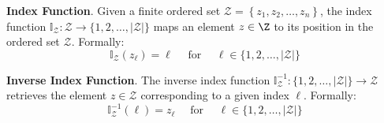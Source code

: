 
\textbf{Index Function}. 
Given a finite ordered set $\mathcal{Z}=\left\{z_1, z_2, \ldots, z_n\right\}$, the index function 
$\mathbb{I}_{\mathcal{Z}}: \mathcal{Z} \rightarrow\{1,2, \ldots,|\mathcal{Z}|\}$
 maps an element $z\in\Z$ to its position in the ordered set $\mathcal{Z}$. Formally:
$$
\mathbb{I}_{\mathcal{Z}}(z_{\ell})=\ell 
\quad \text { for } \quad \ell \in\{1,2, \ldots,|\mathcal{Z}|\}
$$

\textbf{Inverse Index Function}. 
The inverse index function 
$\mathbb{I}_{\mathcal{Z}}^{-1}:\{1,2, \ldots,|\mathcal{Z}|\} \rightarrow \mathcal{Z}$
 retrieves the element $z \in \mathcal{Z}$ corresponding to a given index ${\ell}$.
Formally:
$$
\mathbb{I}_{\mathcal{Z}}^{-1}({\ell})=z_{\ell} \quad \text { for } \quad {\ell} \in\{1,2, \ldots,|\mathcal{Z}|\}
$$


